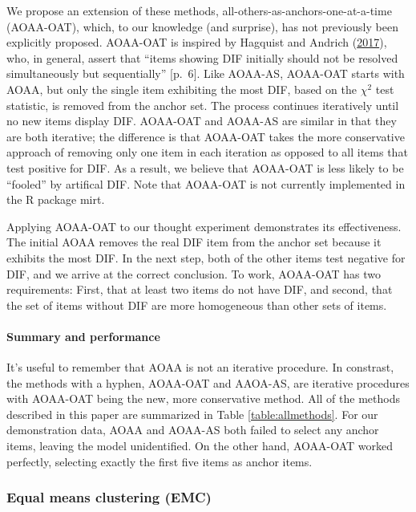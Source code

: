 \documentclass[
  11pt,
]{article}
\begin{document}
We propose an extension of these methods, all-others-as-anchors-one-at-a-time (AOAA-OAT), which, to our knowledge (and surprise), has not previously been explicitly proposed. AOAA-OAT is inspired by Hagquist and Andrich (\protect\hyperlink{ref-hagquist2017recent}{2017}), who, in general, assert that \enquote{items showing DIF initially should not be resolved simultaneously but sequentially} {[}p.~6{]}. Like AOAA-AS, AOAA-OAT starts with AOAA, but only the single item exhibiting the most DIF, based on the \(\chi^2\) test statistic, is removed from the anchor set. The process continues iteratively until no new items display DIF. AOAA-OAT and AOAA-AS are similar in that they are both iterative; the difference is that AOAA-OAT takes the more conservative approach of removing only one item in each iteration as opposed to all items that test positive for DIF. As a result, we believe that AOAA-OAT is less likely to be \enquote{fooled} by artifical DIF. Note that AOAA-OAT is not currently implemented in the R package mirt.

Applying AOAA-OAT to our thought experiment demonstrates its effectiveness. The initial AOAA removes the real DIF item from the anchor set because it exhibits the most DIF. In the next step, both of the other items test negative for DIF, and we arrive at the correct conclusion. To work, AOAA-OAT has two requirements: First, that at least two items do not have DIF, and second, that the set of items without DIF are more homogeneous than other sets of items.

\hypertarget{summary-and-performance}{%
\paragraph{Summary and performance}\label{summary-and-performance}}

It's useful to remember that AOAA is not an iterative procedure. In constrast, the methods with a hyphen, AOAA-OAT and AAOA-AS, are iterative procedures with AOAA-OAT being the new, more conservative method. All of the methods described in this paper are summarized in Table \ref{table:allmethods}. For our demonstration data, AOAA and AOAA-AS both failed to select any anchor items, leaving the model unidentified. On the other hand, AOAA-OAT worked perfectly, selecting exactly the first five items as anchor items.

\hypertarget{equal-means-clustering-emc}{%
\subsubsection{Equal means clustering (EMC)}\label{equal-means-clustering-emc}}
\end{document}
